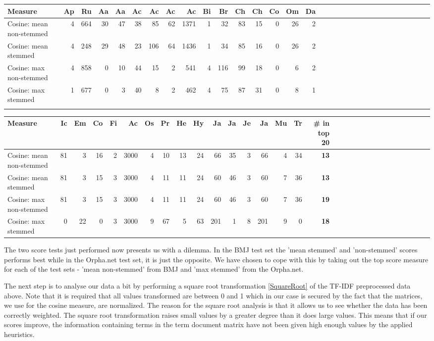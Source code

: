\begin{table}[H]
\label{testResult_termDoc_orphan_hist_3000_ns_mea_s_mea_ns_max_s_max}
\begin{tiny}
  \begin{tabular}{|l|r|r|r|r|r|r|r|r|r|r|r|r|r|r|r|r|r|r|r|r|r|r|r|r|r|r|r|r|r|r|r|}
    \hline
    Measure &Ap&Ru&Aa&Aa&Ac&Ac&Ac&Ac&Bi&Br&Ch&Ch&Co&Om&Da\\
    \hline
    Cosine: mean non-stemmed &4&664&30&47&38&85&62&1371&1&32&83&15&0&26&2\\
    \hline
    Cosine: mean stemmed &4&248&29&48&23&106&64&1436&1&34&85&16&0&26&2\\
    \hline
    Cosine: max non-stemmed &4&858&0&10&44&15&2&541&4&116&99&18&0&6&2\\
    \hline
    Cosine: max stemmed &1&677&0&3&40&8&2&462&4&75&87&31&0&8&1 \\
    \hline
    \multicolumn{16}{c}{} \\
    \end{tabular}
    \begin{tabular}{|l|r|r|r|r|r|r|r|r|r|r|r|r|r|r|r|r|r|r|r|r|r|r|r|r|r|r|r|r|r|r|}
    \hline
     Measure &Ic&Em&Co&Fi&Ac&Os&Pr&He&Hy&Ja&Ja&Je&Ja&Mu&Tr &\scriptsize{\textbf{\# in top 20}} \\
    \hline
    Cosine: mean non-stemmed  &81&3&16&2&3000&4&10&13&24&66&35&3&66&4&34 & \scriptsize{\textbf{13}} \\
    \hline
    Cosine: mean stemmed &81&3&15&3&3000&4&11&11&24&60&46&3&60&7&36 & \scriptsize{\textbf{13}} \\
    \hline
    Cosine: max non-stemmed &81&3&15&3&3000&4&11&11&24&60&46&3&60&7&36 & \scriptsize{\textbf{19}} \\
    \hline
    Cosine: max stemmed &0&22&0&3&3000&9&67&5&63&201&1&8&201&9&0 & \scriptsize{\textbf{18}} \\
    \hline
  \end{tabular}
\end{tiny}
\end{table}

The two score tests just performed now presents us with a dilemma. In the BMJ test set 
the 'mean stemmed' and 'non-stemmed' scores performs best while in the Orpha.net test set, 
it is just the opposite. We have chosen to cope with this by taking out the top score 
measure for each of the test sets - 'mean non-stemmed' from BMJ and 'max stemmed' from 
the Orpha.net.

The next step is to analyse our data a bit by performing a square root transformation 
\ref{SquareRoot} of the TF-IDF preprocessed data above. Note that it is required that 
all values transformed are between 0 and 1 which in our case is secured by the fact 
that the matrices, we use for the cosine measure, are normalized. The reason for the 
square root analysis is that it allows us to see whether the data has been correctly 
weighted. The square root transformation raises small values by a greater degree than 
it does large values. This means that if our scores improve, the information containing 
terms in the term document matrix have not been given high enough values by the applied 
heuristics.

